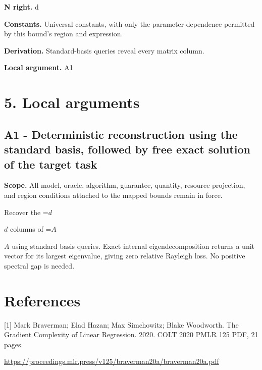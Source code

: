 \documentclass[10pt,a4paper]{article}
\newcommand{\AtlasMath}[1]{\par\begingroup\centering\setbox0=\hbox{$\displaystyle #1$}\ifdim\wd0>1.4\linewidth\typeout{ATLAS WIDE FORMULA: \the\wd0}\fi\ifdim\wd0>\linewidth\resizebox{\linewidth}{!}{\box0}\else\box0\fi\par\endgroup}
\newcommand{\AtlasInlineMath}[1]{\begingroup\setbox0=\hbox{$#1$}\ifdim\wd0>.4\linewidth\endgroup\AtlasMath{#1}\else\endgroup$#1$\fi}
\begin{document}
\textbf{N right.} d

\textbf{Constants.} Universal constants, with only the parameter dependence permitted by this bound’s region and expression.

\textbf{Derivation.} Standard-basis queries reveal every matrix column.

\textbf{Local argument.} A1

\section{5. Local arguments}
\subsection{A1 - Deterministic reconstruction using the standard basis, followed by free exact solution of the target task}
\textbf{Scope.} All model, oracle, algorithm, guarantee, quantity, resource-projection, and region conditions attached to the mapped bounds remain in force.

Recover the \AtlasInlineMath{d} columns of \AtlasInlineMath{A} using standard basis queries. Exact internal eigendecomposition returns a unit vector for its largest eigenvalue, giving zero relative Rayleigh loss. No positive spectral gap is needed.

\section{References}
[1] Mark Braverman; Elad Hazan; Max Simchowitz; Blake Woodworth. The Gradient Complexity of Linear Regression. 2020. COLT 2020 PMLR 125 PDF, 21 pages.

\url{https://proceedings.mlr.press/v125/braverman20a/braverman20a.pdf}
\end{document}
